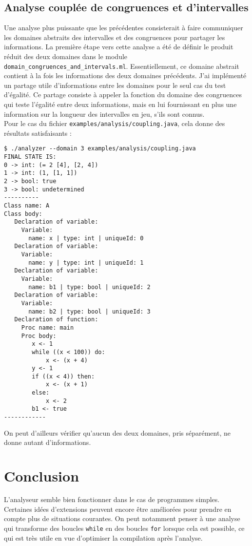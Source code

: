 \documentclass[paper=a4, fontsize=11pt]{scrartcl}
\numberwithin{figure}{section}			%
\numberwithin{table}{section}				%
\begin{document}
\subsection{Analyse couplée de congruences et d'intervalles}

Une analyse plus puissante que les précédentes consisterait à faire communiquer les domaines abstraits des intervalles et des congruences pour partager les informations. La première étape vers cette analyse a été de définir le produit réduit des deux domaines dans le module \texttt{domain\_congruences\_and\_intervals.ml}. Essentiellement, ce domaine abstrait contient à la fois les informations des deux domaines précédents. J'ai implémenté un partage utile d'informations entre les domaines pour le seul cas du test d'égalité. Ce partage consiste à appeler la fonction du domaine des congruences qui teste l'égalité entre deux informations, mais en lui fournissant en plus une information sur la longueur des intervalles en jeu, s'ils sont connus.\\

Pour le cas du fichier \texttt{examples/analysis/coupling.java}, cela donne des résultats satisfaisants :

\begin{verbatim}
$ ./analyzer --domain 3 examples/analysis/coupling.java
FINAL STATE IS:
0 -> int: (= 2 [4], [2, 4])
1 -> int: (1, [1, 1])
2 -> bool: true
3 -> bool: undetermined
----------
Class name: A
Class body:
   Declaration of variable:
     Variable:
       name: x | type: int | uniqueId: 0
   Declaration of variable:
     Variable:
       name: y | type: int | uniqueId: 1
   Declaration of variable:
     Variable:
       name: b1 | type: bool | uniqueId: 2
   Declaration of variable:
     Variable:
       name: b2 | type: bool | uniqueId: 3
   Declaration of function:
     Proc name: main
     Proc body:
        x <- 1
        while ((x < 100)) do:
            x <- (x + 4)
        y <- 1
        if ((x < 4)) then:
            x <- (x + 1)
        else:
            x <- 2
        b1 <- true
------------
\end{verbatim}

On peut d'ailleurs vérifier qu'aucun des deux domaines, pris séparément, ne donne autant d'informations.

\section{Conclusion}

L'analyseur semble bien fonctionner dans le cas de programmes simples. Certaines idées d'extensions peuvent encore être améliorées pour prendre en compte plus de situations courantes. On peut notamment penser à une analyse qui transforme des boucles \texttt{while} en des boucles \texttt{for} lorsque cela est possible, ce qui est très utile en vue d'optimiser la compilation après l'analyse.\\
\end{document}
